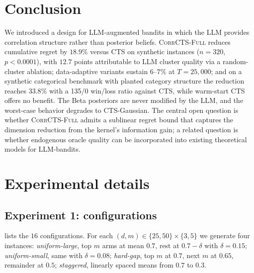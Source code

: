 \documentclass{article}
\theoremstyle{plain}
\theoremstyle{definition}
\theoremstyle{remark}
\newcommand{\CorrFull}{\textsc{CorrCTS-Full}}
\begin{document}
\section{Conclusion}

We introduced a design for LLM-augmented bandits in which the LLM provides correlation structure rather than posterior beliefs.
\CorrFull{} reduces cumulative regret by $18.9\%$ versus CTS on synthetic instances ($n{=}320$, $p < 0.0001$), with $12.7$ points attributable to LLM cluster quality via a random-cluster ablation; data-adaptive variants sustain $6$--$7\%$ at $T{=}25{,}000$; and on a synthetic categorical benchmark with planted category structure the reduction reaches $33.8\%$ with a 135/0 win/loss ratio against CTS, while warm-start CTS offers no benefit.
The Beta posteriors are never modified by the LLM, and the worst-case behavior degrades to CTS-Gaussian.
The central open question is whether \CorrFull{} admits a sublinear regret bound that captures the dimension reduction from the kernel's information gain; a related question is whether endogenous oracle quality can be incorporated into existing theoretical models for LLM-bandits.




\newpage
\appendix
\onecolumn

\section{Experimental details}\label{app:details}

\subsection{Experiment 1: configurations}

 lists the $16$ configurations.
For each $(d,m) \in \{25, 50\} \times \{3, 5\}$ we generate four instances:
\emph{uniform-large}, top $m$ arms at mean $0.7$, rest at $0.7 - \delta$ with $\delta = 0.15$;
\emph{uniform-small}, same with $\delta = 0.08$;
\emph{hard-gap}, top $m$ at $0.7$, next $m$ at $0.65$, remainder at $0.5$;
\emph{staggered}, linearly spaced means from $0.7$ to $0.3$.
\end{document}
